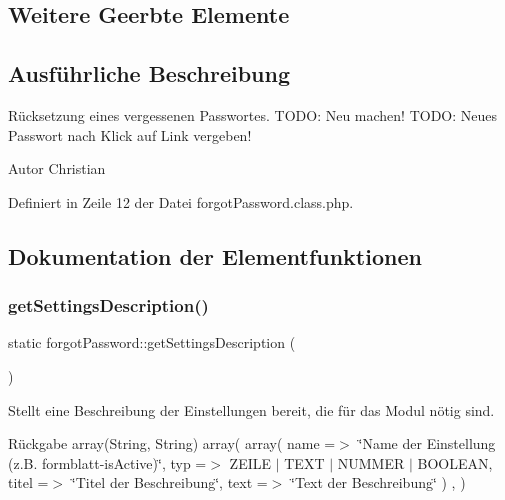 \subsection*{Weitere Geerbte Elemente}


\subsection{Ausführliche Beschreibung}
Rücksetzung eines vergessenen Passwortes. T\+O\+DO\+: Neu machen! T\+O\+DO\+: Neues Passwort nach Klick auf Link vergeben! \begin{DoxyAuthor}{Autor}
Christian 
\end{DoxyAuthor}


Definiert in Zeile 12 der Datei forgot\+Password.\+class.\+php.



\subsection{Dokumentation der Elementfunktionen}
\mbox{\label{classforgot_password_a7dd67a72bbd73fb11b07f23396b44197}} 
\subsubsection{\texorpdfstring{get\+Settings\+Description()}{getSettingsDescription()}}
{\footnotesize\ttfamily static forgot\+Password\+::get\+Settings\+Description (\begin{DoxyParamCaption}{ }\end{DoxyParamCaption})\hspace{0.3cm}{\ttfamily [static]}}

Stellt eine Beschreibung der Einstellungen bereit, die für das Modul nötig sind. \begin{DoxyReturn}{Rückgabe}
array(\+String, String) array( array( \textquotesingle{}name\textquotesingle{} =$>$ \char`\"{}\+Name der Einstellung (z.\+B. formblatt-\/is\+Active)\char`\"{}, \textquotesingle{}typ\textquotesingle{} =$>$ Z\+E\+I\+LE $\vert$ T\+E\+XT $\vert$ N\+U\+M\+M\+ER $\vert$ B\+O\+O\+L\+E\+AN, \textquotesingle{}titel\textquotesingle{} =$>$ \char`\"{}\+Titel der Beschreibung\char`\"{}, \textquotesingle{}text\textquotesingle{} =$>$ \char`\"{}\+Text der Beschreibung\char`\"{} ) , ) 
\end{DoxyReturn}


